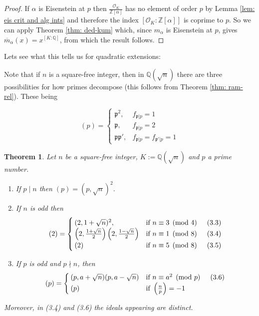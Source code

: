 \documentclass[11pt,a4paper]{report}
\theoremstyle{plain}
\newtheorem{theorem}[subsection]{Theorem}
\theoremstyle{definition}
\theoremstyle{definition}
\newcommand{\ZZ}{\mathbb{Z}}
\def\QQ{\mathbb{Q}}
\def\gothp{\mathfrak{p}}
\def \a{\alpha}
\def \OO {\mathcal{O}}
\def \ov{\overline}
\begin{document}
	\begin{proof}
		If $\a$ is Eisenstein at $p$ then $\frac{\OO_K}{\ZZ[\a]}$ has no element of order $p$ by Lemma \ref{lem: eis crit and alg ints} and therefore the index $[\OO_K:\ZZ[\a]]$ is coprime to $p$. So we can apply Theorem \ref{thm: ded-kum} which, since $m_\a$ is Eisenstein at $p$, gives $\ov{m}_\a(x)=x^{[K:\QQ]}$, from which the result follows.
	\end{proof}
	Lets see what this tells us for quadratic extensions:
	
	Note that if $n$ is a square-free integer, then in $\QQ(\sqrt{n})$ there are three possibilities for how primes decompose (this follows from Theorem \ref{thm: ram-rel}). These being 
	
	\begin{equation}
		(p) = \begin{cases} 
			\gothp^2, & f_{\gothp|p}=1 \\
			\gothp, & f_{\gothp|p}=2 \\
			\gothp\gothp', & f_{\gothp|p}=f_{\gothp'|p}=1
		\end{cases}
	\end{equation}
	
	
	
	\begin{theorem}\label{thm: splitting in quad ext}
		Let $n$ be a square-free integer, $K:=\QQ(\sqrt{n})$ and $p$ a prime number. 
		\begin{enumerate}
			\item[(1)] If $p\mid n$ then $(p)=(p,\sqrt{n})^2$.
			
			\item[(2)] If $n$ is odd then 
			\[
			(2)= \begin{cases}
				(2,1+\sqrt{n})^2, & \text{if } n \equiv 3 \pmod 4   \hspace{0.5cm} (3.3) \\
				\left(2,\frac{1+\sqrt{n}}{2}\right)\left(2,\frac{1-\sqrt{n}}{2}\right) & \text{if } n \equiv 1 \pmod 8 \hspace{0.5cm} (3.4)\\
				(2) &\text{if } n \equiv 5 \pmod 8 \hspace{0.5cm} (3.5)
			\end{cases}
			\]
			
			\item[(3)] If $p$ is odd and $p \nmid n$, then
			\[(p)=\begin{cases}
				(p,a+\sqrt{n})	(p,a-\sqrt{n}) & \text{if } n \equiv a^2 \pmod p  \hspace{0.5cm} (3.6)\\
				(p) &\text{if }  \left( \frac{n}{p}\right)=-1
			\end{cases}\]
			
			
		\end{enumerate}
		
		Moreover, in (3.4) and (3.6) the ideals appearing are distinct.	
	\end{theorem}
	
\end{document}
